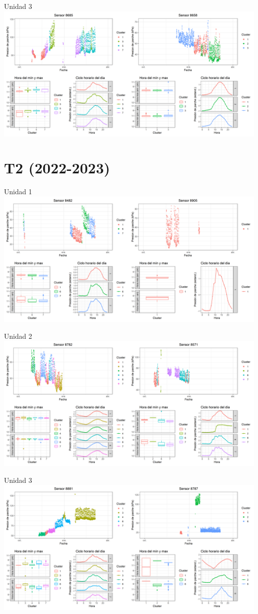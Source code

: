 \documentclass[
  letterpaper,
  DIV=11,
  numbers=noendperiod]{scrreprt}
\begin{document}
Unidad 3
\includegraphics{figuras/02_turgor_limpiado/2022_2023_La_Esperanza_T1_Unidad_3.png}

\chapter{T2 (2022-2023)}

Unidad 1
\includegraphics{figuras/02_turgor_limpiado/2022_2023_La_Esperanza_T2_Unidad_1.png}

Unidad 2
\includegraphics{figuras/02_turgor_limpiado/2022_2023_La_Esperanza_T2_Unidad_2.png}

Unidad 3
\includegraphics{figuras/02_turgor_limpiado/2022_2023_La_Esperanza_T2_Unidad_3.png}
\end{document}
